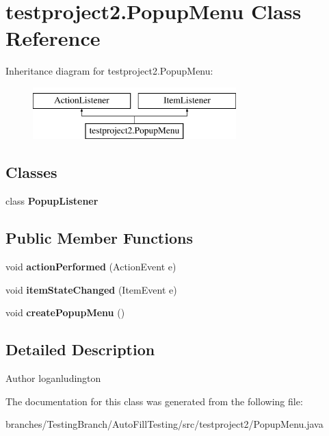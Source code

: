 \hypertarget{classtestproject2_1_1PopupMenu}{\section{testproject2.\-Popup\-Menu Class Reference}
\label{classtestproject2_1_1PopupMenu}
}
Inheritance diagram for testproject2.\-Popup\-Menu\-:\begin{figure}[H]
\begin{center}
\leavevmode
\includegraphics[height=2.000000cm]{classtestproject2_1_1PopupMenu}
\end{center}
\end{figure}
\subsection*{Classes}
\begin{DoxyCompactItemize}
\item 
class {\bfseries Popup\-Listener}
\end{DoxyCompactItemize}
\subsection*{Public Member Functions}
\begin{DoxyCompactItemize}
\item 
\hypertarget{classtestproject2_1_1PopupMenu_a4f20f2c1af3962686f6521fa2e707bcb}{void {\bfseries action\-Performed} (Action\-Event e)}\label{classtestproject2_1_1PopupMenu_a4f20f2c1af3962686f6521fa2e707bcb}

\item 
\hypertarget{classtestproject2_1_1PopupMenu_a8894ca73b034049db8ee7d3d0ddc7189}{void {\bfseries item\-State\-Changed} (Item\-Event e)}\label{classtestproject2_1_1PopupMenu_a8894ca73b034049db8ee7d3d0ddc7189}

\item 
\hypertarget{classtestproject2_1_1PopupMenu_a0f1b099fae95358a03f7314228d76277}{void {\bfseries create\-Popup\-Menu} ()}\label{classtestproject2_1_1PopupMenu_a0f1b099fae95358a03f7314228d76277}

\end{DoxyCompactItemize}


\subsection{Detailed Description}
\begin{DoxyAuthor}{Author}
loganludington 
\end{DoxyAuthor}


The documentation for this class was generated from the following file\-:\begin{DoxyCompactItemize}
\item 
branches/\-Testing\-Branch/\-Auto\-Fill\-Testing/src/testproject2/Popup\-Menu.\-java\end{DoxyCompactItemize}
